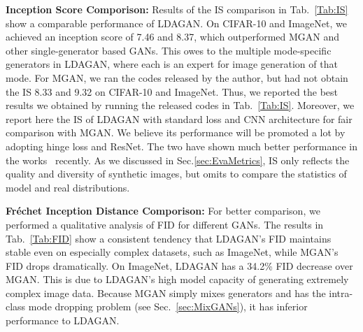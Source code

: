 \documentclass{article}
\begin{document}
\noindent\textbf{Inception Score Comporison:} Results of the IS comparison in Tab.~\ref{Tab:IS} show a comparable performance of LDAGAN.
On CIFAR-10 and ImageNet, we achieved an inception score of 7.46 and 8.37, which outperformed MGAN and other single-generator based GANs.
This owes to the multiple mode-specific generators in LDAGAN, where each is an expert for image generation of that mode.
For MGAN, we ran the codes released by the author, but had not obtain the IS 8.33 and 9.32 on CIFAR-10 and ImageNet.
Thus, we reported the best results we obtained by running the released codes in Tab.~\ref{Tab:IS}.
Moreover, we report here the IS of LDAGAN with standard loss and CNN architecture for fair comparison with MGAN.
We believe its performance will be promoted a lot by adopting hinge loss and ResNet.
The two have shown much better performance in the works~\cite{tran2018dist,miyato2018spectral} recently.
As we discussed in Sec.\ref{sec:EvaMetrics}, IS only reflects the quality and diversity of synthetic images, but omits to compare the statistics of model and real distributions.


\begin{table*}[h]
\caption{Fr\'{e}chet Inception Distance on different datasets.}
\label{Tab:FID}
\centering
{}
\end{table*}


\noindent\textbf{Fr\'{e}chet Inception Distance Comporison:} For better comparison, we performed a qualitative analysis of FID for different GANs.
The results in Tab.~\ref{Tab:FID} show a consistent tendency that LDAGAN's FID maintains stable even on especially complex datasets, such as ImageNet, while MGAN's FID drops dramatically.
On ImageNet, LDAGAN has a 34.2\% FID decrease over MGAN.
This is due to LDAGAN's high model capacity of generating extremely complex image data.
Because MGAN simply mixes generators and has the intra-class mode dropping problem (see Sec.~\ref{sec:MixGANs}), it has inferior performance to LDAGAN.
\end{document}
